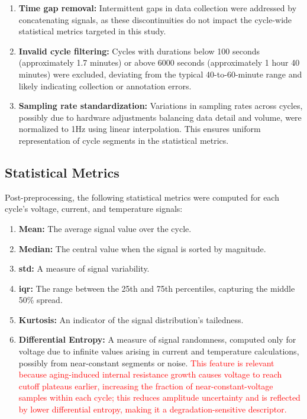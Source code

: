 \begin{enumerate}
    \item \textbf{Time gap removal:} Intermittent gaps in data collection were addressed by concatenating signals, as these discontinuities do not impact the cycle-wide statistical metrics targeted in this study.
    \item \textbf{Invalid cycle filtering:} Cycles with durations below 100 seconds (approximately 1.7 minutes) or above 6000 seconds (approximately 1 hour 40 minutes) were excluded, deviating from the typical 40-to-60-minute range and likely indicating collection or annotation errors.
    \item \textbf{Sampling rate standardization:} Variations in sampling rates across cycles, possibly due to hardware adjustments balancing data detail and volume, were normalized to 1Hz using linear interpolation. This ensures uniform representation of cycle segments in the statistical metrics.
\end{enumerate}

\subsection{Statistical Metrics}

Post-preprocessing, the following statistical metrics were computed for each cycle’s voltage, current, and temperature signals:

\begin{enumerate}
    \item \textbf{Mean:} The average signal value over the cycle.
    \item \textbf{Median:} The central value when the signal is sorted by magnitude.
    \item \textbf{\acf{std}:} A measure of signal variability.
    \item \textbf{\acf{iqr}:} The range between the 25th and 75th percentiles, capturing the middle 50\% spread.
    \item \textbf{Kurtosis:} An indicator of the signal distribution’s tailedness.
    \item \textbf{Differential Entropy:} A measure of signal randomness, computed only for voltage due to infinite values arising in current and temperature calculations, possibly from near-constant segments or noise. \textcolor{red}{This feature is relevant because aging-induced internal resistance growth causes voltage to reach cutoff plateaus earlier, increasing the fraction of near-constant-voltage samples within each cycle; this reduces amplitude uncertainty and is reflected by lower differential entropy, making it a degradation-sensitive descriptor.}
\end{enumerate}

